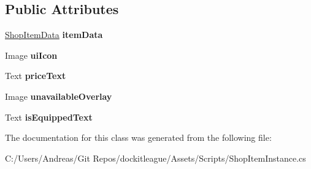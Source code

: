\subsection*{Public Attributes}
\begin{DoxyCompactItemize}
\item 
\hypertarget{class_shop_item_instance_a7eb9cf48698f0151fe22caa2599c118a}{}\label{class_shop_item_instance_a7eb9cf48698f0151fe22caa2599c118a} 
\hyperlink{class_shop_item_data}{Shop\+Item\+Data} {\bfseries item\+Data}
\item 
\hypertarget{class_shop_item_instance_aa7c0d71870f8b820ef3adae07a505c7e}{}\label{class_shop_item_instance_aa7c0d71870f8b820ef3adae07a505c7e} 
Image {\bfseries ui\+Icon}
\item 
\hypertarget{class_shop_item_instance_a4897a5316e64ad787baf101ed39d52a7}{}\label{class_shop_item_instance_a4897a5316e64ad787baf101ed39d52a7} 
Text {\bfseries price\+Text}
\item 
\hypertarget{class_shop_item_instance_a68bd80671ff5a5d7c651a1f987f6ec10}{}\label{class_shop_item_instance_a68bd80671ff5a5d7c651a1f987f6ec10} 
Image {\bfseries unavailable\+Overlay}
\item 
\hypertarget{class_shop_item_instance_a4996325d4cb1e1ccfc0a7862cf4eb8e1}{}\label{class_shop_item_instance_a4996325d4cb1e1ccfc0a7862cf4eb8e1} 
Text {\bfseries is\+Equipped\+Text}
\end{DoxyCompactItemize}


The documentation for this class was generated from the following file\+:\begin{DoxyCompactItemize}
\item 
C\+:/\+Users/\+Andreas/\+Git Repos/dockitleague/\+Assets/\+Scripts/Shop\+Item\+Instance.\+cs\end{DoxyCompactItemize}
